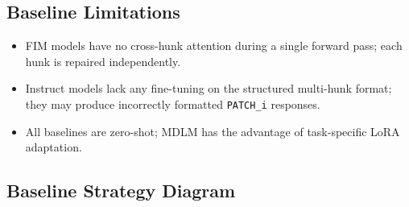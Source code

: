 \documentclass[11pt,a4paper]{article}
\begin{document}
\subsection{Baseline Limitations}

\begin{itemize}[noitemsep]
  \item FIM models have no cross-hunk attention during a single forward pass; each hunk is repaired independently.
  \item Instruct models lack any fine-tuning on the structured multi-hunk format; they may produce incorrectly formatted \texttt{PATCH\_i} responses.
  \item All baselines are zero-shot; MDLM has the advantage of task-specific LoRA adaptation.
\end{itemize}

\subsection{Baseline Strategy Diagram}
\end{document}
